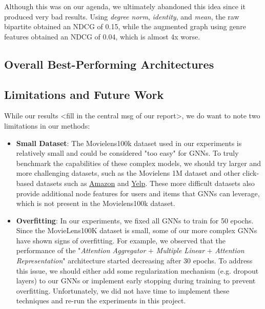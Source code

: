 \documentclass{article}
\begin{document}
Although this was on our agenda, we ultimately abandoned this idea since it produced very bad results. Using \textit{degree norm}, \textit{identity}, and \textit{mean}, the raw bipartite obtained an NDCG of 0.15, while the augmented graph using genre features obtained an NDCG of 0.04, which is almost 4x worse.

\subsection{Overall Best-Performing Architectures}


\subsection{Limitations and Future Work}


While our results <fill in the central msg of our report>, we do want to note two limitations in our methods:

\begin{itemize}
    \item \textbf{Small Dataset}: The Movielens100k dataset used in our experiments is relatively small and could be considered "too easy" for GNNs. To truly benchmark the capabilities of these complex models, we should try larger and more challenging datasets, such as the Movielens 1M dataset and other click-based datasets such as \href{http://jmcauley.ucsd.edu/data/amazon/links.html}{Amazon} and \href{https://www.yelp.com/dataset}{Yelp}. These more difficult datasets also provide additional node features for users and items that GNNs can leverage, which is not present in the Movielens100k dataset.
    \item \textbf{Overfitting}: In our experiments, we fixed all GNNs to train for 50 epochs. Since the MovieLens100K dataset is small, some of our more complex GNNs have shown signs of overfitting. For example, we observed that the performance of the "\textit{Attention Aggregator} + \textit{Multiple Linear} + \textit{Attention Representation}" architecture started decreasing after 30 epochs. To address this issue, we should either add some regularization mechanism (e.g. dropout layers) to our GNNs or implement early stopping during training to prevent overfitting. Unfortunately, we did not have time to implement these techniques and re-run the experiments in this project.
\end{itemize}
\end{document}
